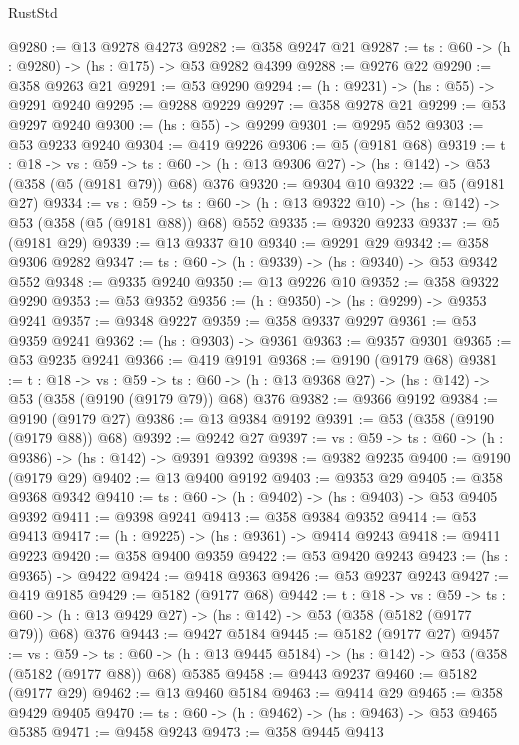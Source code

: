 \begin{lexlean}{RustStd}
\begin{coremodule}
@9280 := @13 @9278 @4273
@9282 := @358 @9247 @21
@9287 := {ts : @60} -> (h : @9280) -> (hs : @175) -> @53 @9282 @4399
@9288 := @9276 @22
@9290 := @358 @9263 @21
@9291 := @53 @9290
@9294 := (h : @9231) -> (hs : @55) -> @9291 @9240
@9295 := @9288 @9229
@9297 := @358 @9278 @21
@9299 := @53 @9297 @9240
@9300 := (hs : @55) -> @9299
@9301 := @9295 @52
@9303 := @53 @9233 @9240
@9304 := @419 @9226
@9306 := @5 (@9181 @68)
@9319 := {t : @18} ->
  {vs : @59} ->
  {ts : @60} -> (h : @13 @9306 @27) -> (hs : @142) -> @53 (@358 (@5 (@9181 @79)) @68) @376
@9320 := @9304 @10
@9322 := @5 (@9181 @27)
@9334 := {vs : @59} ->
  {ts : @60} -> (h : @13 @9322 @10) -> (hs : @142) -> @53 (@358 (@5 (@9181 @88)) @68) @552
@9335 := @9320 @9233
@9337 := @5 (@9181 @29)
@9339 := @13 @9337 @10
@9340 := @9291 @29
@9342 := @358 @9306 @9282
@9347 := {ts : @60} -> (h : @9339) -> (hs : @9340) -> @53 @9342 @552
@9348 := @9335 @9240
@9350 := @13 @9226 @10
@9352 := @358 @9322 @9290
@9353 := @53 @9352
@9356 := (h : @9350) -> (hs : @9299) -> @9353 @9241
@9357 := @9348 @9227
@9359 := @358 @9337 @9297
@9361 := @53 @9359 @9241
@9362 := (hs : @9303) -> @9361
@9363 := @9357 @9301
@9365 := @53 @9235 @9241
@9366 := @419 @9191
@9368 := @9190 (@9179 @68)
@9381 := {t : @18} ->
  {vs : @59} ->
  {ts : @60} -> (h : @13 @9368 @27) -> (hs : @142) -> @53 (@358 (@9190 (@9179 @79)) @68) @376
@9382 := @9366 @9192
@9384 := @9190 (@9179 @27)
@9386 := @13 @9384 @9192
@9391 := @53 (@358 (@9190 (@9179 @88)) @68)
@9392 := @9242 @27
@9397 := {vs : @59} -> {ts : @60} -> (h : @9386) -> (hs : @142) -> @9391 @9392
@9398 := @9382 @9235
@9400 := @9190 (@9179 @29)
@9402 := @13 @9400 @9192
@9403 := @9353 @29
@9405 := @358 @9368 @9342
@9410 := {ts : @60} -> (h : @9402) -> (hs : @9403) -> @53 @9405 @9392
@9411 := @9398 @9241
@9413 := @358 @9384 @9352
@9414 := @53 @9413
@9417 := (h : @9225) -> (hs : @9361) -> @9414 @9243
@9418 := @9411 @9223
@9420 := @358 @9400 @9359
@9422 := @53 @9420 @9243
@9423 := (hs : @9365) -> @9422
@9424 := @9418 @9363
@9426 := @53 @9237 @9243
@9427 := @419 @9185
@9429 := @5182 (@9177 @68)
@9442 := {t : @18} ->
  {vs : @59} ->
  {ts : @60} -> (h : @13 @9429 @27) -> (hs : @142) -> @53 (@358 (@5182 (@9177 @79)) @68) @376
@9443 := @9427 @5184
@9445 := @5182 (@9177 @27)
@9457 := {vs : @59} ->
  {ts : @60} -> (h : @13 @9445 @5184) -> (hs : @142) -> @53 (@358 (@5182 (@9177 @88)) @68) @5385
@9458 := @9443 @9237
@9460 := @5182 (@9177 @29)
@9462 := @13 @9460 @5184
@9463 := @9414 @29
@9465 := @358 @9429 @9405
@9470 := {ts : @60} -> (h : @9462) -> (hs : @9463) -> @53 @9465 @5385
@9471 := @9458 @9243
@9473 := @358 @9445 @9413

\end{coremodule}
\end{lexlean}
